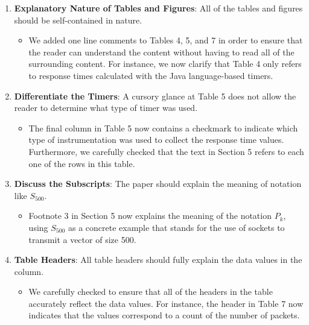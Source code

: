 \documentclass[11pt]{article}
\begin{document}
\begin{enumerate}
\begin{itemize}
    \end{itemize}

  \item {\bf Explanatory Nature of Tables and Figures}: All of the
    tables and figures should be self-contained in nature.

    \begin{itemize}
      
      \item We added one line comments to Tables 4, 5, and 7 in order
        to ensure that the reader can understand the content without
        having to read all of the surrounding content.  For instance,
        we now clarify that Table 4 only refers to response times
        calculated with the Java language-based timers.
        
    \end{itemize}

  \item {\bf Differentiate the Timers}: A cursory glance at Table 5
    does not allow the reader to determine what type of timer was
    used.

    \begin{itemize}
      
      \item The final column in Table 5 now contains a checkmark to
        indicate which type of instrumentation was used to collect the
        response time values.  Furthermore, we carefully checked that
        the text in Section 5 refers to each one of the rows in this
        table.
        
    \end{itemize}

  \item {\bf Discuss the Subscripts}: The paper should explain the
    meaning of notation like $S_{500}$.

    \begin{itemize}
      
      \item Footnote 3 in Section 5 now explains the meaning of the
        notation $P_k$, using $S_{500}$ as a concrete example that
        stands for the use of sockets to transmit a vector of size
        500.
        
    \end{itemize}

  \item {\bf Table Headers}: All table headers should fully explain
    the data values in the column.

    \begin{itemize}
      
      \item We carefully checked to ensure that all of the headers in
        the table accurately reflect the data values.  For instance,
        the header in Table 7 now indicates that the values correspond
        to a count of the number of packets.
        
    \end{itemize}

\end{enumerate}
\end{document}
